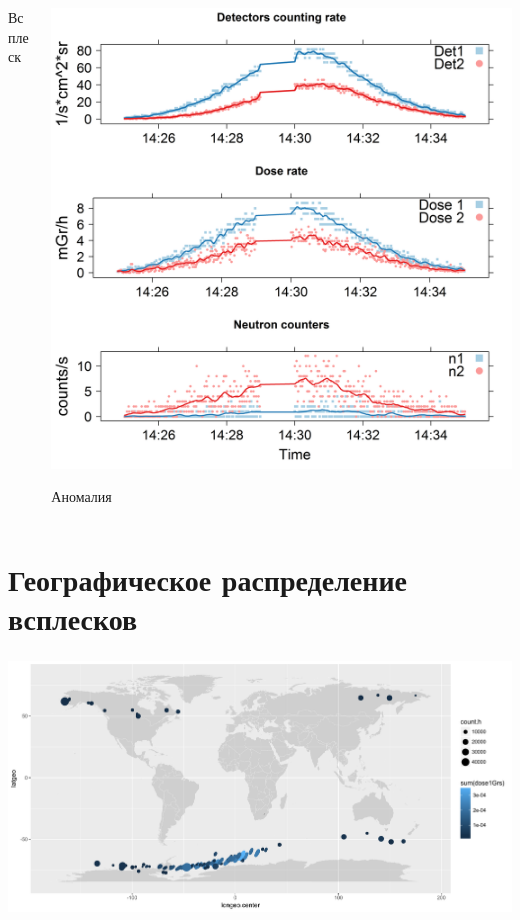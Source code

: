 \documentclass[t, aspectratio=43]{beamer}
\begin{document}
\begin{frame}
\begin{columns}
\begin{column}[t]{.5\textwidth}
	 Всплеск
	\end{column}
	\hfill
	\begin{column}[t]{.5\textwidth}
	\includegraphics[width=1\linewidth]{images/anomalycross}
	
	\centering Аномалия
	\end{column}%
\end{columns}
\begin{center}
		

\end{center}


\end{frame}
\section{Географическое распределение всплесков}

\begin{frame}	
\frametitle{\insertsection} 
\begin{center}
	\includegraphics[width=1.1\linewidth]{images/flashmap}
\end{center}


\end{frame}
\end{document}
